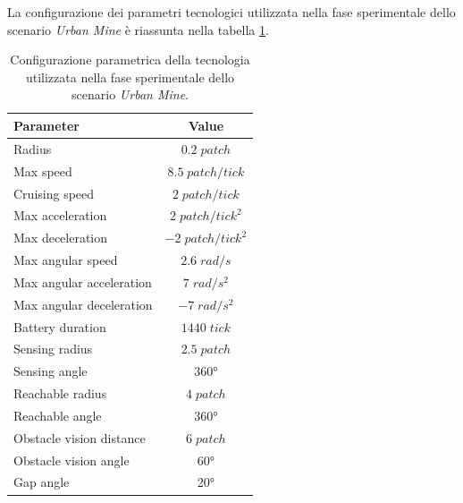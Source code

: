 La configurazione dei parametri tecnologici utilizzata nella fase sperimentale dello scenario \textit{Urban Mine} è  riassunta nella tabella \ref{tabella_parametri_urbanMine}.

\begin{table}[H]
    \centering
    
    \begin{tabular}{|l|c|}
    \hline
    \textbf{Parameter}              & \textbf{Value}                \\ \hline
    Radius                          & $0.2 \; patch$                \\ \hline
    Max speed                       & $8.5 \; patch/tick$           \\ \hline
    Cruising speed                  & $2 \; patch/tick$             \\ \hline
    Max acceleration                & $2 \; patch/tick^{2}$         \\ \hline
    Max deceleration                & $-2 \; patch/tick^{2}$        \\ \hline
    Max angular speed               & $2.6 \; rad/s$                \\ \hline
    Max angular acceleration        & $7 \; rad/s^{2}$              \\ \hline
    Max angular deceleration        & $-7 \; rad/s^{2}$             \\ \hline
    Battery duration                & $1440 \; tick$                \\ \hline
    Sensing radius                  & $2.5 \; patch$                \\ \hline
    Sensing angle                   & \ang{360}                        \\ \hline
    Reachable radius                & $4 \; patch$                  \\ \hline
    Reachable angle                 & \ang{360}                        \\ \hline
    Obstacle vision distance        & $6 \; patch$                  \\ \hline
    Obstacle vision angle           & \ang{60}                        \\ \hline
    Gap angle                       & \ang{20}                        \\ \hline
    \end{tabular}%
    
    \caption{Configurazione parametrica della tecnologia utilizzata nella fase sperimentale dello scenario \textit{Urban Mine}.}
    \label{tabella_parametri_urbanMine}
\end{table}

